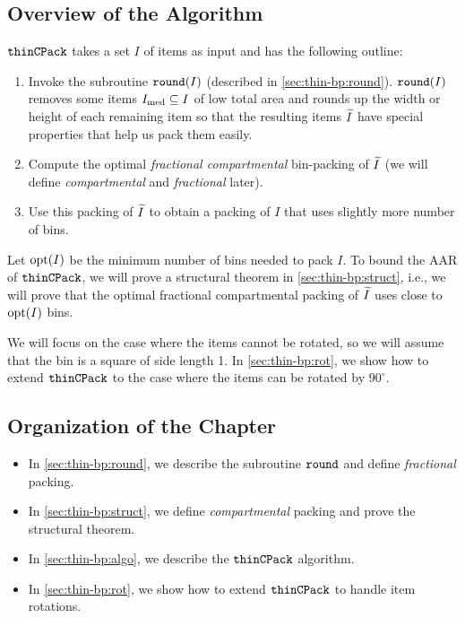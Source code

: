 \thinBPIntro

\subsection*{Overview of the Algorithm}

$\operatorname{\mathtt{thinCPack}}$ takes a set $I$ of items as input and has the following outline:
\begin{enumerate}
\item Invoke the subroutine $\operatorname{\mathtt{round}}(I)$ (described in \cref{sec:thin-bp:round}).
    $\operatorname{\mathtt{round}}(I)$ removes some items $I_{\mathrm{med}} \subseteq I$ of low total area and
    rounds up the width or height of each remaining item
    so that the resulting items $\widetilde{I}$ have special properties
    that help us pack them easily.
\item Compute the optimal \emph{fractional compartmental} bin-packing of $\widetilde{I}$
    (we will define \emph{compartmental} and \emph{fractional} later).
\item Use this packing of $\widetilde{I}$ to obtain a packing of $I$
    that uses slightly more number of bins.
\end{enumerate}

Let $\operatorname{opt}(I)$ be the minimum number of bins needed to pack $I$.
To bound the AAR of $\operatorname{\mathtt{thinCPack}}$, we will prove a structural theorem
in \cref{sec:thin-bp:struct}, i.e., we will prove that
the optimal fractional compartmental packing of $\widetilde{I}$ uses close to $\operatorname{opt}(I)$ bins.

We will focus on the case where the items cannot be rotated,
so we will assume \wLoG{} that the bin is a square of side length 1.
In \cref{sec:thin-bp:rot}, we show how to extend $\operatorname{\mathtt{thinCPack}}$ to the case
where the items can be rotated by $90^{\circ}$.

\subsection*{Organization of the Chapter}

\begin{itemize}
\item In \cref{sec:thin-bp:round}, we describe the subroutine $\operatorname{\mathtt{round}}$
    and define \emph{fractional} packing.
\item In \cref{sec:thin-bp:struct}, we define \emph{compartmental} packing
    and prove the structural theorem.
\item In \cref{sec:thin-bp:algo}, we describe the $\operatorname{\mathtt{thinCPack}}$ algorithm.
\item In \cref{sec:thin-bp:rot}, we show how to extend $\operatorname{\mathtt{thinCPack}}$ to
    handle item rotations.
\end{itemize}
